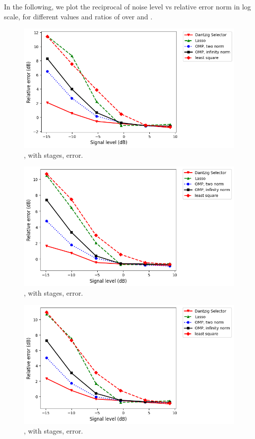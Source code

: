 In the following, we plot the reciprocal of noise level vs relative error norm in log scale, for different values and ratios of  over  and .

\begin {figure} [H]
\includegraphics [width = \textwidth] {error-small-square-two.png}
\caption {, with  stages, error.}
\end {figure}

\begin {figure} [H]
\includegraphics [width = \textwidth] {error-small-tall-two.png}
\caption {, with  stages, error.}
\end {figure}

\begin {figure} [H]
\includegraphics [width = \textwidth] {error-small-wide-two.png}
\caption {, with  stages, error.}
\end {figure}

